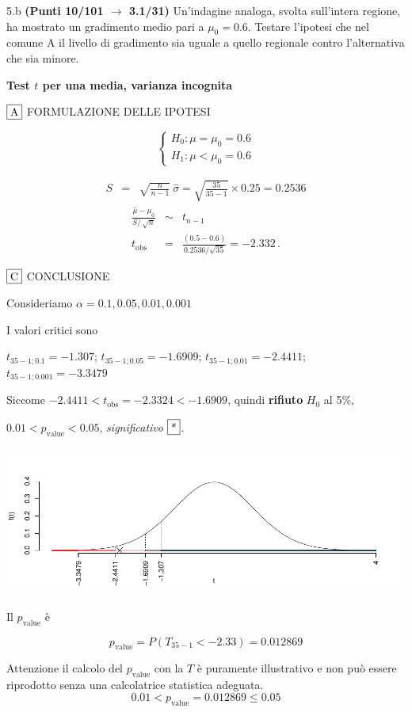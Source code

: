 \documentclass[
  11pt,
]{book}
\theoremstyle{mytheoremstyle}
\theoremstyle{mydefstyle}
\newenvironment{sol}
  {
  \begin{tcolorbox}[enhanced,breakable,arc=0.1mm,boxrule=1pt,colback=white,colframe=iblue,
  title=\bf \fontfamily{lmss}\selectfont \hspace{.5 cm} Soluzione,drop fuzzy shadow]

}{
\end{tcolorbox}
  }
\begin{document}
5.b \textbf{(Punti 10/101 \(\rightarrow\) 3.1/31)} Un'indagine analoga, svolta sull'intera regione, ha mostrato un gradimento medio pari a \(\mu_0=0.6\). Testare l'ipotesi che nel comune A il livello di gradimento sia uguale a quello regionale contro l'alternativa che sia minore.

\begin{sol}
\textbf{Test \(t\) per una media, varianza incognita}

\(\fbox{A}\) FORMULAZIONE DELLE IPOTESI

\[\begin{cases}
   H_0: \mu = \mu_0=0.6 \\
   H_1: \mu < \mu_0=0.6 
   \end{cases}\]

\begin{eqnarray*}
   S    &=& \sqrt{\frac{n} {n-1}}\ \widehat{\sigma} 
   =  \sqrt{\frac{ 35 } { 35 -1}} \times  0.25  =  0.2536 
   \end{eqnarray*}
\begin{eqnarray*}
   \frac{\hat\mu - \mu_{0}} {S/\,\sqrt{n}}&\sim&t_{n-1}\\
   t_{\text{obs}}
   &=& \frac{ ( 0.5 -  0.6 )} { 0.2536 /\sqrt{ 35 }}
   =   -2.332 \, .
   \end{eqnarray*}

\(\fbox{C}\) CONCLUSIONE

Consideriamo \(\alpha=0.1, 0.05, 0.01, 0.001\)

I valori critici sono

\(t_{35-1;0.1}=-1.307\); \(t_{35-1;0.05}=-1.6909\); \(t_{35-1;0.01}=-2.4411\); \(t_{35-1;0.001}=-3.3479\)

Siccome \(-2.4411<t_\text{obs}=-2.3324<-1.6909\), quindi \textbf{rifiuto} \(H_0\) al 5\%,

\(0.01<p_\text{value}<0.05\), \emph{significativo} \(\fbox{*}\).

\begin{center}\includegraphics{Esami_passati_con_soluzioni_files/figure-latex/2023-53,-1} \end{center}

Il \(p_{\text{value}}\) è

\[ p_{\text{value}} = P(T_{35-1}<-2.33)=0.012869 \]

Attenzione il calcolo del \(p_\text{value}\) con la \(T\) è puramente illustrativo e non può essere riprodotto senza una calcolatrice statistica adeguata.\[
 0.01 < p_\text{value}= 0.012869 \leq 0.05 
\]

\end{sol}
\end{document}
